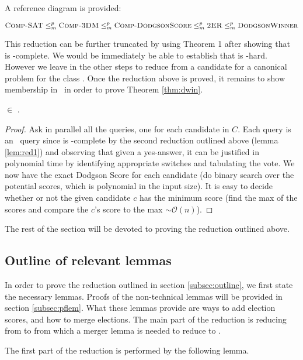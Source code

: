 A reference diagram is provided:

\[\text{{\sc Comp-SAT}} \le_m^p \text{{\sc Comp-3DM}} \le_m^p
\text{{\sc Comp-DodgsonScore}} \le_m^p
\text{{\sc 2ER}} \le_m^p \text{{\sc DodgsonWinner}}\]

This reduction can be further truncated by using Theorem 1 after showing
that \dscore~ is \np-complete.
We would be immediately be able to establish that 
is \tp-hard.
However we leave in the other steps to reduce from a candidate for a canonical
problem for the class \tp.
Once the reduction above is proved, it remains to show membership in \tp~in order
to prove Theorem \ref{thm:dwin}.
\begin{theorem} \label{thm:intp}
     $\in$ \tp. \\
\end{theorem}
\begin{proof}
    Ask in parallel all the  queries,
    one for each candidate in $C$.
    Each query is an \np~query since  is \np-complete by
    the second reduction outlined above (lemma \ref{lem:red1}) and observing
    that given a yes-answer, it can be justified in polynomial time by
    identifying appropriate switches and tabulating the vote.
    We now have the exact Dodgson Score for each candidate (do binary search
    over the potential scores, which is polynomial in the input size).
    It is easy to decide
    whether or not the given candidate $c$ has the minimum score
    (find the max of the scores and compare the $c$'s score to
    the max $\sim\mathcal{O}(n)$).
\end{proof}

The rest of the section will be devoted to proving the reduction outlined above.

\subsection{Outline of relevant lemmas}

In order to prove the reduction outlined in section \ref{subsec:outline},
we first state the necessary lemmas.
Proofs of the non-technical lemmas will be provided in section \ref{subsec:pflem}.
What these lemmas provide are ways to add election scores, and how to merge elections.
The main part of the reduction is reducing from \csat to 
from which a merger lemma is needed to reduce to \dwin.

The first part of the reduction is performed by the following lemma.


